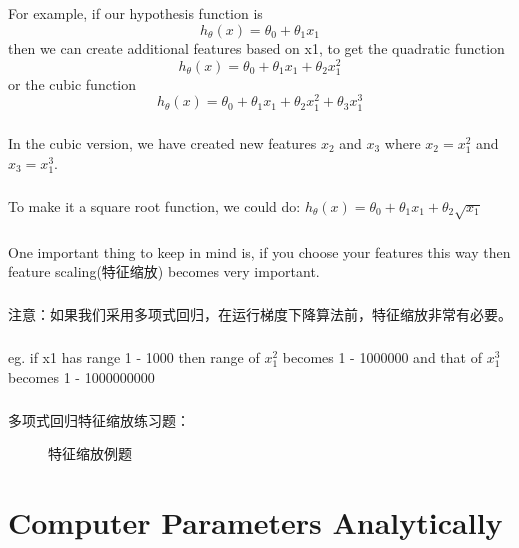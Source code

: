 \documentclass{article}
\begin{document}
\begin{CJK}{UTF8}{gbsn}
\subparagraph*{}
For example, if our hypothesis function is \begin{equation}
h_\theta(x)=\theta_0+\theta_1x_1
\end{equation}
then we can create additional features based on x1, to get the quadratic function \begin{equation}
h_\theta(x)=\theta_0+\theta_1x_1+\theta_2x_1^2
\end{equation} or the cubic function \begin{equation}
h_\theta(x)=\theta_0+\theta_1x_1+\theta_2x_1^2+\theta_3x_1^3
\end{equation}
\subparagraph*{}
In the cubic version, we have created new features $x_2$ and $x_3$ where $x_2=x_1^2$ and $x_3=x_1^3$.
\subparagraph*{}
To make it a square root function, we could do: $h_\theta(x)=\theta_0+\theta_1x_1+\theta_2\sqrt{x_1}$
\subparagraph*{}
One important thing to keep in mind is, if you choose your features this way then feature scaling(特征缩放) becomes very important.
\subparagraph*{}
注意：如果我们采用多项式回归，在运行梯度下降算法前，特征缩放非常有必要。
\subparagraph*{}
eg. if x1 has range 1 - 1000 then range of $x_1^2$ becomes 1 - 1000000 and that of $x_1^3$ becomes 1 - 1000000000
\subparagraph*{}
多项式回归特征缩放练习题：
\begin{figure}[H]
\caption{特征缩放例题}
\label{fig:230}
\end{figure}
\section{Computer Parameters Analytically}

\end{CJK}
\end{document}
